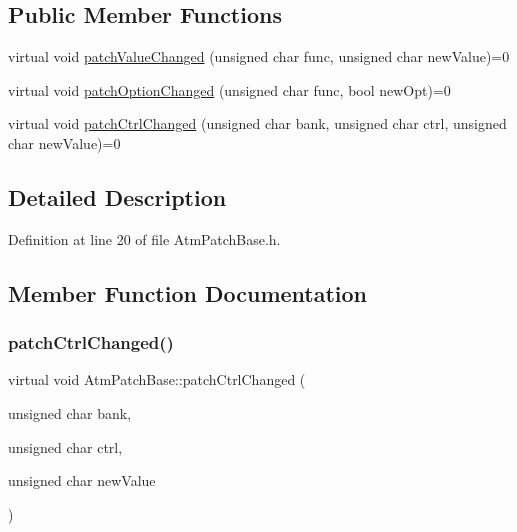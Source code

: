 \subsection*{Public Member Functions}
\begin{DoxyCompactItemize}
\item 
virtual void \hyperlink{class_atm_patch_base_ad561145330e0b53990f222c243ef5e89}{patch\+Value\+Changed} (unsigned char func, unsigned char new\+Value)=0
\item 
virtual void \hyperlink{class_atm_patch_base_ad31f8d45a0a630ee3052d69ee125e2f3}{patch\+Option\+Changed} (unsigned char func, bool new\+Opt)=0
\item 
virtual void \hyperlink{class_atm_patch_base_a10abe1d35a241d61a83473ef8caaee33}{patch\+Ctrl\+Changed} (unsigned char bank, unsigned char ctrl, unsigned char new\+Value)=0
\end{DoxyCompactItemize}


\subsection{Detailed Description}


Definition at line 20 of file Atm\+Patch\+Base.\+h.



\subsection{Member Function Documentation}
\mbox{\label{class_atm_patch_base_a10abe1d35a241d61a83473ef8caaee33}} 
\subsubsection{\texorpdfstring{patch\+Ctrl\+Changed()}{patchCtrlChanged()}}
{\footnotesize\ttfamily virtual void Atm\+Patch\+Base\+::patch\+Ctrl\+Changed (\begin{DoxyParamCaption}\item[{unsigned char}]{bank,  }\item[{unsigned char}]{ctrl,  }\item[{unsigned char}]{new\+Value }\end{DoxyParamCaption})\hspace{0.3cm}{\ttfamily [pure virtual]}}



